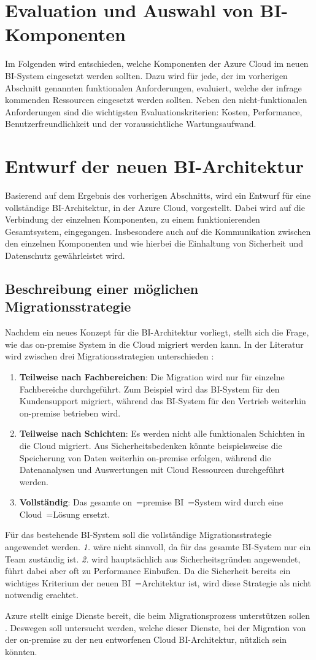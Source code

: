 \section{Evaluation und Auswahl von BI-Komponenten}
\label{sec:evaluationUndAuswahl}
Im Folgenden wird entschieden, welche Komponenten der Azure Cloud im neuen BI-System eingesetzt werden sollten. Dazu wird für jede, der im vorherigen Abschnitt genannten funktionalen Anforderungen, evaluiert, welche der infrage kommenden Ressourcen eingesetzt werden sollten. Neben den nicht-funktionalen Anforderungen sind die wichtigsten Evaluationskriterien: Kosten, Performance, Benutzerfreundlichkeit und der voraussichtliche Wartungsaufwand.

\section{Entwurf der neuen BI-Architektur}
\label{sec:entwurfBIArchitektur}
Basierend auf dem Ergebnis des vorherigen Abschnitts, wird ein Entwurf für eine vollständige BI-Architektur, in der Azure Cloud, vorgestellt. Dabei wird auf die Verbindung der einzelnen Komponenten, zu einem funktionierenden Gesamtsystem, eingegangen. Insbesondere auch auf die Kommunikation zwischen den einzelnen Komponenten und wie hierbei die Einhaltung von Sicherheit und Datenschutz gewährleistet wird.

\subsection{Beschreibung einer möglichen Migrationsstrategie}
\label{sec:beschreibungMigrationsstrategie}
Nachdem ein neues Konzept für die BI-Architektur vorliegt, stellt sich die Frage, wie das on-premise System in die Cloud migriert werden kann. In der Literatur wird zwischen drei Migrationsstrategien unterschieden \cite{juan-verdejo_moving_2014}:
\begin{enumerate}
\item \textbf{Teilweise nach Fachbereichen}: Die Migration wird nur für einzelne Fachbereiche durchgeführt. Zum Beispiel wird das BI-System für den Kundensupport migriert, während das BI-System für den Vertrieb weiterhin on-premise betrieben wird.
\item \textbf{Teilweise nach Schichten}: Es werden nicht alle funktionalen Schichten in die Cloud migriert. Aus Sicherheitsbedenken könnte beispielsweise die Speicherung von Daten weiterhin on-premise erfolgen, während die Datenanalysen und Auswertungen mit Cloud Ressourcen durchgeführt werden.
\item \textbf{Vollständig}: Das gesamte on~=premise BI~=System wird durch eine Cloud~=Lösung ersetzt.
\end{enumerate}
Für das bestehende BI-System soll die vollständige Migrationsstrategie angewendet werden. \textit{1.} wäre nicht sinnvoll, da für das gesamte BI-System nur ein Team zuständig ist. \textit{2.} wird hauptsächlich aus Sicherheitsgründen angewendet, führt dabei aber oft zu Performance Einbußen. Da die Sicherheit bereits ein wichtiges Kriterium der neuen BI~=Architektur ist, wird diese Strategie als nicht notwendig erachtet.

Azure stellt einige Dienste bereit, die beim Migrationsprozess unterstützen sollen \cite{chilberto_building_2020}. Deswegen soll untersucht werden, welche dieser Dienste, bei der Migration von der on-premise zu der neu entworfenen Cloud BI-Architektur, nützlich sein könnten.